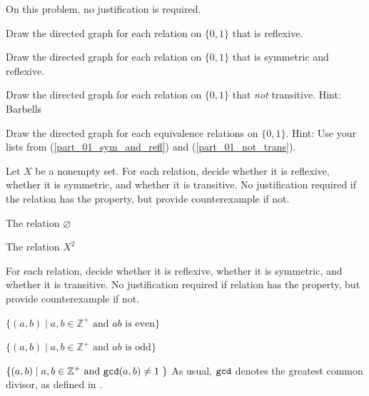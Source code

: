 \begin{exer}[\exerU] %
\label{exer_ppty_rel01}
    On this problem, no justification is required.
        \begin{exerpart}
            \item Draw the directed graph for each relation on $\{0,1\}$ that is reflexive.
            \item \label{part_01_sym_and_refl} Draw the directed graph for each relation on $\{0,1\}$ that is symmetric and reflexive.
            \item \label{part_01_not_trans} Draw the directed graph for each relation on $\{0,1\}$ that \emph{not} transitive. Hint: Barbells
            \item Draw the directed graph for each equivalence relations on $\{0,1\}$.  Hint: Use your lists from (\ref{part_01_sym_and_refl}) and (\ref{part_01_not_trans}).
        \end{exerpart}
\end{exer}

\begin{exer}[\exerU] %
\label{exer_name_empty_complete_rel}
    Let $X$ be a nonempty set.  For each relation, decide whether it is reflexive, whether it is symmetric, and whether it is transitive.  No justification required if the relation has the property, but provide counterexample if not.
        \begin{exerpart}
            \item The relation $\varnothing$ 
            \item The relation $X^2$ %
        \end{exerpart}
\end{exer}

\begin{exer}[\exerU] %
\label{exer_ppty_rel_on_integers}
    For each relation, decide whether it is reflexive, whether it is symmetric, and whether it is transitive. No justification required if relation has the property, but provide counterexample if not. 
        \begin{exerpart}
            \item $\{(a,b) \mid a,b \in \mathbb{Z}^+ \text{ and } ab \text{ is even}  \}$
            \item $\{(a,b) \mid a,b \in \mathbb{Z}^+ \text{ and }  ab \text{ is odd} \}$
            \item $\{(a,b) \mid a,b \in \mathbb{Z}^+ \text{ and }  \texttt{gcd}(a,b)\neq1~ \}$
            As usual, $\texttt{gcd}$ denotes the greatest common divisor, as defined in .
        \end{exerpart}
\end{exer}

